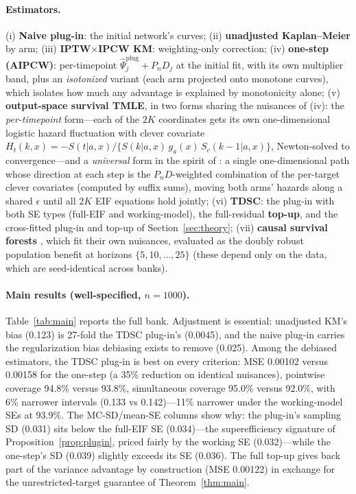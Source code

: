\documentclass[11pt]{article}
\theoremstyle{remark}
\newcommand{\Pn}{P_n}
\begin{document}
\paragraph{Estimators.} (i) \textbf{Naive plug-in}: the initial network's curves; (ii) \textbf{unadjusted Kaplan--Meier} by arm; (iii) \textbf{IPTW$\times$IPCW KM}: weighting-only correction; (iv) \textbf{one-step (AIPCW)}: per-timepoint $\widehat\Psi_j^{\mathrm{plug}} + \Pn D_j$ at the initial fit, with its own multiplier band, plus an \emph{isotonized} variant (each arm projected onto monotone curves), which isolates how much any advantage is explained by monotonicity alone; (v) \textbf{output-space survival TMLE}, in two forms sharing the nuisances of (iv): the \emph{per-timepoint} form---each of the $2K$ coordinates gets its own one-dimensional logistic hazard fluctuation with clever covariate $H_t(k,x) = -S(t|a,x)/\{S(k|a,x)\,g_a(x)\,S_c(k{-}1|a,x)\}$, Newton-solved to convergence---and a \emph{universal} form in the spirit of \citet{vdlgruber2016,cai2020,rytgaard2024}: a single one-dimensional path whose direction at each step is the $\Pn D$-weighted combination of the per-target clever covariates (computed by suffix sums), moving both arms' hazards along a shared $\epsilon$ until all $2K$ EIF equations hold jointly; (vi) \textbf{TDSC}: the plug-in with both SE types (full-EIF and working-model), the full-residual \textbf{top-up}, and the cross-fitted plug-in and top-up of Section~\ref{sec:theory}; (vii) \textbf{causal survival forests} \citep{cui2023csf}, which fit their own nuisances, evaluated as the doubly robust population benefit at horizons $\{5,10,\dots,25\}$ (these depend only on the data, which are seed-identical across banks).

\paragraph{Main results (well-specified, $n=1000$).} Table~\ref{tab:main} reports the full bank. Adjustment is essential: unadjusted KM's bias (0.123) is 27-fold the TDSC plug-in's (0.0045), and the naive plug-in carries the regularization bias debiasing exists to remove (0.025). Among the debiased estimators, the TDSC plug-in is best on every criterion: MSE 0.00102 versus 0.00158 for the one-step (a 35\% reduction on identical nuisances), pointwise coverage 94.8\% versus 93.8\%, simultaneous coverage 95.0\% versus 92.0\%, with 6\% narrower intervals (0.133 vs 0.142)---11\% narrower under the working-model SEs at 93.9\%. The MC-SD/mean-SE columns show why: the plug-in's sampling SD (0.031) sits below the full-EIF SE (0.034)---the superefficiency signature of Proposition~\ref{prop:plugin}, priced fairly by the working SE (0.032)---while the one-step's SD (0.039) slightly exceeds its SE (0.036). The full top-up gives back part of the variance advantage by construction (MSE 0.00122) in exchange for the unrestricted-target guarantee of Theorem~\ref{thm:main}.
\end{document}
